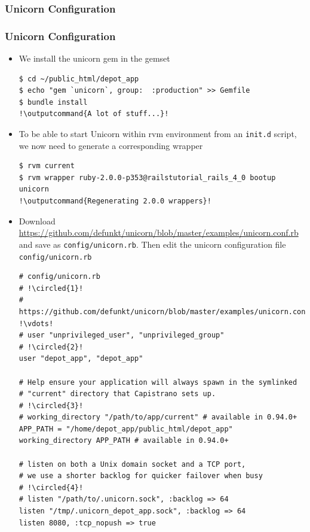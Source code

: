 \documentclass{beamer}
\newcommand*\circled[1]{\tikz[baseline=(char.base)]{
            \node[shape=circle,draw,inner sep=2pt] (char) {#1};}}
\newcommand{\outputcommand}[1]{\color{darkgreen}{#1}}
\begin{document}
\subsubsection{Unicorn Configuration}
\begin{frame}
\frametitle{Unicorn Configuration}

\begin{itemize}
\item  We install the unicorn gem in the gemset

\lstset{language=shell, escapechar=!}
\begin{lstlisting}[escapechar=!]
$ cd ~/public_html/depot_app
$ echo "gem `unicorn`, group:  :production" >> Gemfile
$ bundle install
!\outputcommand{A lot of stuff...}!
\end{lstlisting}

\item To be able to start Unicorn within \acrshort{rvm} environment from an \texttt{init.d} script, we now need to generate a corresponding wrapper

\lstset{language=shell, escapechar=!}
\begin{lstlisting}[escapechar=!]
$ rvm current
$ rvm wrapper ruby-2.0.0-p353@railstutorial_rails_4_0 bootup unicorn
!\outputcommand{Regenerating 2.0.0 wrappers}!
\end{lstlisting}

\item Download \href{https://github.com/defunkt/unicorn/blob/master/examples/unicorn.conf.rb}{https://github.com/defunkt/unicorn/blob/master/examples/unicorn.conf.rb}
and save as \texttt{config/unicorn.rb}. Then edit the unicorn configuration file \texttt{config/unicorn.rb}

\lstset{language=Ruby, style=eclipse}
\begin{lstlisting}[escapechar=!]
# config/unicorn.rb
# !\circled{1}!
# https://github.com/defunkt/unicorn/blob/master/examples/unicorn.conf.rb
!\vdots!
# user "unprivileged_user", "unprivileged_group"
# !\circled{2}!
user "depot_app", "depot_app"

# Help ensure your application will always spawn in the symlinked
# "current" directory that Capistrano sets up.
# !\circled{3}!
# working_directory "/path/to/app/current" # available in 0.94.0+
APP_PATH = "/home/depot_app/public_html/depot_app"
working_directory APP_PATH # available in 0.94.0+

# listen on both a Unix domain socket and a TCP port,
# we use a shorter backlog for quicker failover when busy
# !\circled{4}!
# listen "/path/to/.unicorn.sock", :backlog => 64
listen "/tmp/.unicorn_depot_app.sock", :backlog => 64
listen 8080, :tcp_nopush => true


\end{lstlisting}
\end{itemize}
\end{frame}
\end{document}
